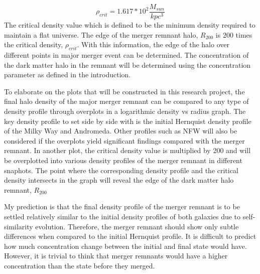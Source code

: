 \documentclass[twocolumn]{aastex63}
\begin{document}
\[ \rho_{crit} = 1.617*10^2 \frac{M_{sun}}{kpc^3} \] 
The critical density value which is defined to be the minimum density required to maintain a flat universe. The edge of the merger remnant halo, $R_{200}$ is 200 times the critical density, $\rho_{crit}$. With this information, the edge of the halo over different points in major merger event can be determined. The concentration of the dark matter halo in the remnant will be determined using the concentration parameter as defined in the introduction.\par
To elaborate on the plots that will be constructed in this research project, the final halo density of the major merger remnant can be compared to any type of density profile through overplots in a logarithmic density vs radius graph. The key density profile to set side by side with is the initial Hernquist density profile of the Milky Way and Andromeda. Other profiles such as NFW will also be considered if the overplots yield significant findings compared with the merger remnant. In another plot, the critical density value is multiplied by 200 and will be overplotted into various density profiles of the merger remnant in different snaphots. The point where the corresponding density profile and the critical density intersects in the graph will reveal the edge of the dark matter halo remnant, $R_{200}$\par
My prediction is that the final density profile of the merger remnant is to be settled relatively similar to the initial density profiles of both galaxies due to self-similarity evolution. Therefore, the merger remnant should show only subtle differences when compared to the initial Hernquist profile. It is difficult to predict how much concentration change between the initial and final state would have. However, it is trivial to think that merger remnants would have a higher concentration than the state before they merged.\par



\end{document}
